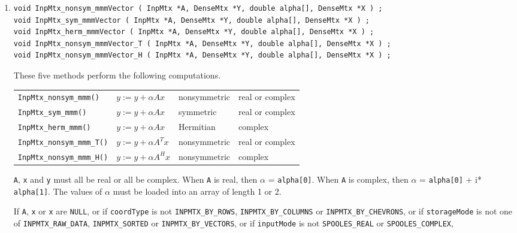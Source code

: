 \begin{enumerate}
\item
\begin{verbatim}
void InpMtx_nonsym_mmmVector ( InpMtx *A, DenseMtx *Y, double alpha[], DenseMtx *X ) ;
void InpMtx_sym_mmmVector ( InpMtx *A, DenseMtx *Y, double alpha[], DenseMtx *X ) ;
void InpMtx_herm_mmmVector ( InpMtx *A, DenseMtx *Y, double alpha[], DenseMtx *X ) ;
void InpMtx_nonsym_mmmVector_T ( InpMtx *A, DenseMtx *Y, double alpha[], DenseMtx *X ) ;
void InpMtx_nonsym_mmmVector_H ( InpMtx *A, DenseMtx *Y, double alpha[], DenseMtx *X ) ;
\end{verbatim}
These five methods perform the following computations.
\begin{center}
\begin{tabular}{llll}
{\tt InpMtx\_nonsym\_mmm()} 
   &  $y := y + \alpha A x$
   & nonsymmetric
   & real or complex \\
{\tt InpMtx\_sym\_mmm()} 
   &  $y := y + \alpha A x$
   & symmetric
   & real or complex \\
{\tt InpMtx\_herm\_mmm()} 
   &  $y := y + \alpha A x$
   & Hermitian
   & complex \\
{\tt InpMtx\_nonsym\_mmm\_T()} 
   &  $y := y + \alpha A^T x$
   & nonsymmetric
   & real or complex \\
{\tt InpMtx\_nonsym\_mmm\_H()} 
   &  $y := y + \alpha A^H x$
   & nonsymmetric
   & complex 
\end{tabular}
\end{center}
{\tt A}, {\tt x} and {\tt y} must all be real or all be complex.
When {\tt A} is real, then $\alpha$ = {\tt alpha[0]}.
When {\tt A} is complex, then $\alpha$ = 
{\tt alpha[0]} + i* {\tt alpha[1]}.
The values of $\alpha$ must be loaded into an array of length 1 or 2.
\par {}
If {\tt A}, {\tt x} or {\tt x} are {\tt NULL},
or if {\tt coordType} is not {\tt INPMTX\_BY\_ROWS},
{\tt INPMTX\_BY\_COLUMNS} or {\tt INPMTX\_BY\_CHEVRONS},
or if {\tt storageMode} is not one of {\tt INPMTX\_RAW\_DATA},
{\tt INPMTX\_SORTED} or {\tt INPMTX\_BY\_VECTORS},
or if {\tt inputMode} is not {\tt SPOOLES\_REAL} or
{\tt SPOOLES\_COMPLEX},

\end{enumerate}
